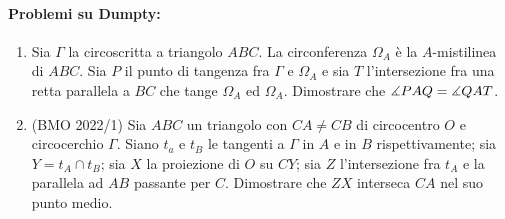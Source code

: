 \documentclass{article}
\begin{document}
\paragraph{Problemi su Dumpty:}
\begin{enumerate}
	\item Sia $\Gamma$ la circoscritta a triangolo $ABC$.
		La circonferenza $\Omega_A$ è la $A$-mistilinea di $ABC$.
		Sia $P$ il punto di tangenza fra $\Gamma$ e $\Omega_A$ e sia
		$T$ l'intersezione fra una retta parallela a $BC$ che tange
		$\Omega_A$ ed $\Omega_A$. Dimostrare che $\measuredangle{PAQ}=\measuredangle{QAT}$.
	\item (BMO 2022/1) Sia $ABC$ un triangolo con $CA\ne CB$ di circocentro $O$
		e circocerchio $\Gamma$. Siano $t_a$ e $t_B$ le tangenti a $\Gamma$
		in $A$ e in $B$ rispettivamente; sia $Y=t_A\cap t_B$; sia
		$X$ la proiezione di $O$ su $CY$; sia $Z$
		l'intersezione fra $t_A$ e la parallela ad $AB$ passante per $C$.
		Dimostrare che $ZX$ interseca $CA$ nel suo punto medio.
\end{enumerate}
\end{document}
